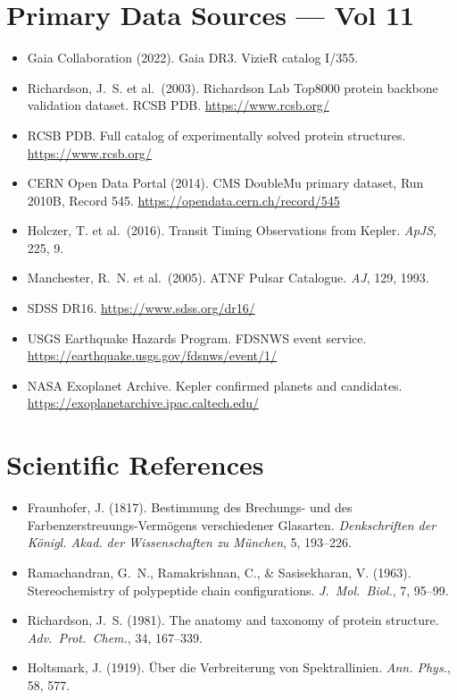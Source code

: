 \documentclass[11pt, letterpaper, openany]{book}
\begin{document}
\begin{empiricalbox}
\section*{Primary Data Sources --- Vol 11}
\begin{itemize}
    \item Gaia Collaboration (2022). Gaia DR3. VizieR catalog I/355.
    \item Richardson, J.~S. et al.\ (2003). Richardson Lab Top8000 protein backbone validation dataset. RCSB PDB. \url{https://www.rcsb.org/}
    \item RCSB PDB. Full catalog of experimentally solved protein structures. \url{https://www.rcsb.org/}
    \item CERN Open Data Portal (2014). CMS DoubleMu primary dataset, Run 2010B, Record 545. \url{https://opendata.cern.ch/record/545}
    \item Holczer, T. et al.\ (2016). Transit Timing Observations from Kepler. \textit{ApJS}, 225, 9.
    \item Manchester, R.~N. et al.\ (2005). ATNF Pulsar Catalogue. \textit{AJ}, 129, 1993.
    \item SDSS DR16. \url{https://www.sdss.org/dr16/}
    \item USGS Earthquake Hazards Program. FDSNWS event service. \url{https://earthquake.usgs.gov/fdsnws/event/1/}
    \item NASA Exoplanet Archive. Kepler confirmed planets and candidates. \url{https://exoplanetarchive.ipac.caltech.edu/}
\end{itemize}

\section*{Scientific References}
\begin{itemize}
    \item Fraunhofer, J. (1817). Bestimmung des Brechungs- und des Farbenzerstreuungs-Verm\"ogens verschiedener Glasarten. \textit{Denkschriften der K\"onigl. Akad. der Wissenschaften zu M\"unchen}, 5, 193--226.
    \item Ramachandran, G.~N., Ramakrishnan, C., \& Sasisekharan, V. (1963). Stereochemistry of polypeptide chain configurations. \textit{J.\ Mol.\ Biol.}, 7, 95--99.
    \item Richardson, J.~S. (1981). The anatomy and taxonomy of protein structure. \textit{Adv.\ Prot.\ Chem.}, 34, 167--339.
    \item Holtsmark, J. (1919). \"Uber die Verbreiterung von Spektrallinien. \textit{Ann. Phys.}, 58, 577.
\end{itemize}


\end{empiricalbox}
\end{document}
